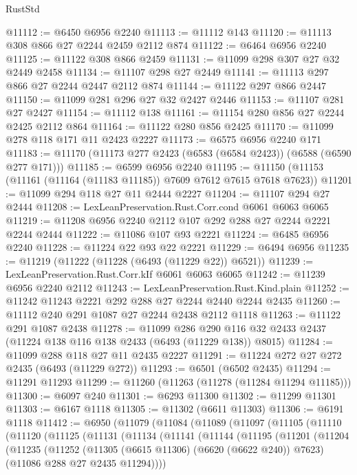 \begin{lexlean}{RustStd}
\begin{coremodule}
@11112 := @6450 @6956 @2240
@11113 := @11112 @143
@11120 := @11113 @308 @866 @27 @2244 @2459 @2112 @874
@11122 := @6464 @6956 @2240
@11125 := @11122 @308 @866 @2459
@11131 := @11099 @298 @307 @27 @32 @2449 @2458
@11134 := @11107 @298 @27 @2449
@11141 := @11113 @297 @866 @27 @2244 @2447 @2112 @874
@11144 := @11122 @297 @866 @2447
@11150 := @11099 @281 @296 @27 @32 @2427 @2446
@11153 := @11107 @281 @27 @2427
@11154 := @11112 @138
@11161 := @11154 @280 @856 @27 @2244 @2425 @2112 @864
@11164 := @11122 @280 @856 @2425
@11170 := @11099 @278 @118 @171 @11 @2423 @2227
@11173 := @6575 @6956 @2240 @171
@11183 := @11170 (@11173 @277 @2423 (@6583 (@6584 @2423)) (@6588 (@6590 @277 @171)))
@11185 := @6599 @6956 @2240
@11195 := @11150 (@11153 (@11161 (@11164 (@11183 @11185)) @7609 @7612 @7615 @7618 @7623))
@11201 := @11099 @294 @118 @27 @11 @2444 @2227
@11204 := @11107 @294 @27 @2444
@11208 := LexLeanPreservation.Rust.Corr.cond @6061 @6063 @6065
@11219 := @11208 @6956 @2240 @2112 @107 @292 @288 @27 @2244 @2221 @2244 @2444
@11222 := @11086 @107 @93 @2221
@11224 := @6485 @6956 @2240
@11228 := @11224 @22 @93 @22 @2221
@11229 := @6494 @6956
@11235 := @11219 (@11222 (@11228 (@6493 (@11229 @22)) @6521))
@11239 := LexLeanPreservation.Rust.Corr.kIf @6061 @6063 @6065
@11242 := @11239 @6956 @2240 @2112
@11243 := LexLeanPreservation.Rust.Kind.plain
@11252 := @11242 @11243 @2221 @292 @288 @27 @2244 @2440 @2244 @2435
@11260 := @11112 @240 @291 @1087 @27 @2244 @2438 @2112 @1118
@11263 := @11122 @291 @1087 @2438
@11278 := @11099
    @286
    @290
    @116
    @32
    @2433
    @2437
    (@11224 @138 @116 @138 @2433 (@6493 (@11229 @138)) @8015)
@11284 := @11099 @288 @118 @27 @11 @2435 @2227
@11291 := @11224 @272 @27 @272 @2435 (@6493 (@11229 @272))
@11293 := @6501 (@6502 @2435)
@11294 := @11291 @11293
@11299 := @11260 (@11263 (@11278 (@11284 @11294 @11185)))
@11300 := @6097 @240
@11301 := @6293 @11300
@11302 := @11299 @11301
@11303 := @6167 @1118
@11305 := @11302 (@6611 @11303)
@11306 := @6191 @1118
@11412 := @6950
    (@11079
      (@11084
        (@11089
          (@11097
            (@11105
              (@11110
                (@11120
                  (@11125
                    (@11131
                      (@11134
                        (@11141
                          (@11144
                            (@11195
                              (@11201
                                (@11204
                                  (@11235
                                    (@11252
                                      (@11305 (@6615 @11306) (@6620 (@6622 @240)) @7623)
                                      (@11086 @288 @27 @2435 @11294))))

\end{coremodule}
\end{lexlean}
